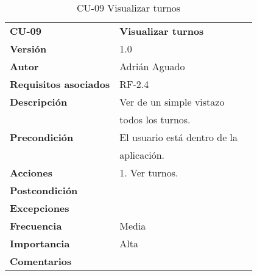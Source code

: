 \begin{table}[H]
\begin{tabular}{llr}  
\toprule
\begin{minipage}[b]{0.24\columnwidth}\raggedright\strut
\textbf{CU-09}\strut
\end{minipage} & \begin{minipage}[b]{0.72\columnwidth}\raggedright\strut
\textbf{ Visualizar turnos}\strut
\end{minipage}\tabularnewline
\cmidrule(r){1-2}
\textbf{Versión}       & 1.0           \\
\textbf{Autor}       & Adrián  Aguado    \\
\textbf{Requisitos asociados}       & RF-2.4 \\ 
\textbf{Descripción} & Ver de un simple vistazo \\
&todos los turnos. \\
\textbf{Precondición} & El usuario está dentro de la \\
& aplicación.       \\
\textbf{Acciones} & 1. Ver turnos. \\
\textbf{Postcondición} &   \\
\textbf{Excepciones} &     \\
\textbf{Frecuencia} & Media          \\
\textbf{Importancia} & Alta            \\
\textbf{Comentarios } &      \\
\bottomrule
\end{tabular}
\caption{CU-09 Visualizar turnos} 
\end{table}

